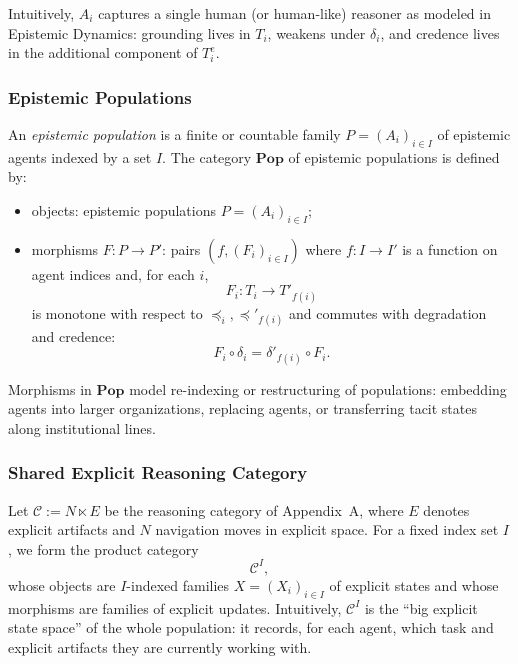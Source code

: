 Intuitively, $A_i$ captures a single human (or human-like) reasoner as modeled
in Epistemic Dynamics: grounding lives in $T_i$, weakens under $\delta_i$,
and credence lives in the additional component of $T^e_i$.

\subsubsection{Epistemic Populations}

\begin{definition}
An \emph{epistemic population} is a finite or countable family
$P = (A_i)_{i \in I}$ of epistemic agents indexed by a set $I$.
The category $\mathbf{Pop}$ of epistemic populations is defined by:
\begin{itemize}
  \item objects: epistemic populations $P = (A_i)_{i \in I}$;
  \item morphisms $F : P \to P'$: pairs $(f,(F_i)_{i\in I})$ where
        $f : I \to I'$ is a function on agent indices and, for each $i$,
        \[
          F_i : T_i \to T'_{f(i)}
        \]
        is monotone with respect to $\preceq_i,\preceq'_{f(i)}$ and
        commutes with degradation and credence:
        \[
          F_i \circ \delta_i = \delta'_{f(i)} \circ F_i.
        \]
\end{itemize}
\end{definition}

Morphisms in $\mathbf{Pop}$ model re-indexing or restructuring of populations:
embedding agents into larger organizations, replacing agents, or transferring
tacit states along institutional lines.

\subsubsection{Shared Explicit Reasoning Category}

Let $\mathcal{C} := N \ltimes E$ be the reasoning category of Appendix~A,
where $E$ denotes explicit artifacts and $N$ navigation moves in explicit
space. For a fixed index set $I$, we form the product category
\[
  \mathcal{C}^I,
\]
whose objects are $I$-indexed families $X = (X_i)_{i \in I}$ of explicit
states and whose morphisms are families of explicit updates. Intuitively,
$\mathcal{C}^I$ is the ``big explicit state space'' of the whole population:
it records, for each agent, which task and explicit artifacts they are
currently working with.

